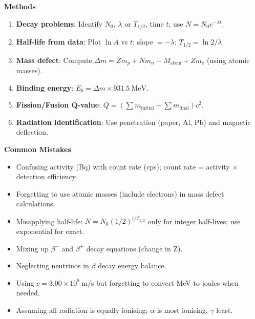 \documentclass[11pt]{article}
\begin{document}
\begin{bilan}
\textbf{Methods}\par
\begin{enumerate}
\item \textbf{Decay problems}: Identify $N_0$, $\lambda$ or $T_{1/2}$, time $t$; use $N = N_0 e^{-\lambda t}$.
\item \textbf{Half-life from data}: Plot $\ln A$ vs $t$; slope $= -\lambda$; $T_{1/2} = \ln 2 / \lambda$.
\item \textbf{Mass defect}: Compute $\Delta m = Zm_p + Nm_n - M_{\text{atom}} + Zm_e$ (using atomic masses).
\item \textbf{Binding energy}: $E_b = \Delta m \times 931.5\ \mathrm{MeV}$.
\item \textbf{Fission/Fusion Q-value}: $Q = (\sum m_{\text{initial}} - \sum m_{\text{final}})c^2$.
\item \textbf{Radiation identification}: Use penetration (paper, Al, Pb) and magnetic deflection.
\end{enumerate}

\textbf{Common Mistakes}\par
\begin{itemize}
\item Confusing activity (Bq) with count rate (cps); count rate = activity $\times$ detection efficiency.
\item Forgetting to use atomic masses (include electrons) in mass defect calculations.
\item Misapplying half-life: $N = N_0 (1/2)^{t/T_{1/2}}$ only for integer half-lives; use exponential for exact.
\item Mixing up $\beta^-$ and $\beta^+$ decay equations (change in Z).
\item Neglecting neutrinos in $\beta$ decay energy balance.
\item Using $c = 3.00 \times 10^8\ \mathrm{m/s}$ but forgetting to convert MeV to joules when needed.
\item Assuming all radiation is equally ionising; $\alpha$ is most ionising, $\gamma$ least.
\end{itemize}


\end{bilan}
\end{document}
